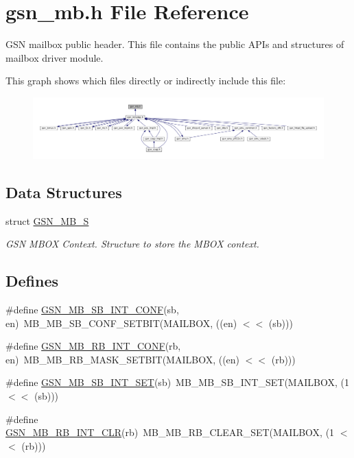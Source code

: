 \hypertarget{a00525}{
\section{gsn\_\-mb.h File Reference}
\label{a00525}
}


GSN mailbox public header. This file contains the public APIs and structures of mailbox driver module.  


This graph shows which files directly or indirectly include this file:
\nopagebreak
\begin{figure}[H]
\begin{center}
\leavevmode
\includegraphics[width=400pt]{a00760}
\end{center}
\end{figure}
\subsection*{Data Structures}
\begin{DoxyCompactItemize}
\item 
struct \hyperlink{a00139}{GSN\_\-MB\_\-S}
\begin{DoxyCompactList}\small\item\em GSN MBOX Context. Structure to store the MBOX context. \end{DoxyCompactList}\end{DoxyCompactItemize}
\subsection*{Defines}
\begin{DoxyCompactItemize}
\item 
\#define \hyperlink{a00525_adfbaa97a4590a64dfd56d720fb2f4645}{GSN\_\-MB\_\-SB\_\-INT\_\-CONF}(sb, en)~MB\_\-MB\_\-SB\_\-CONF\_\-SETBIT(MAILBOX, ((en) $<$$<$ (sb)))
\item 
\#define \hyperlink{a00525_a85b0babd88d99e1dbd6c323a480cc137}{GSN\_\-MB\_\-RB\_\-INT\_\-CONF}(rb, en)~MB\_\-MB\_\-RB\_\-MASK\_\-SETBIT(MAILBOX, ((en) $<$$<$ (rb)))
\item 
\#define \hyperlink{a00525_a84aef445e34477fbec0d2246ae0cd35d}{GSN\_\-MB\_\-SB\_\-INT\_\-SET}(sb)~MB\_\-MB\_\-SB\_\-INT\_\-SET(MAILBOX, (1 $<$$<$ (sb)))
\item 
\#define \hyperlink{a00525_a04fc90919358b378b6a48e622756492f}{GSN\_\-MB\_\-RB\_\-INT\_\-CLR}(rb)~MB\_\-MB\_\-RB\_\-CLEAR\_\-SET(MAILBOX, (1 $<$$<$ (rb)))
\end{DoxyCompactItemize}

